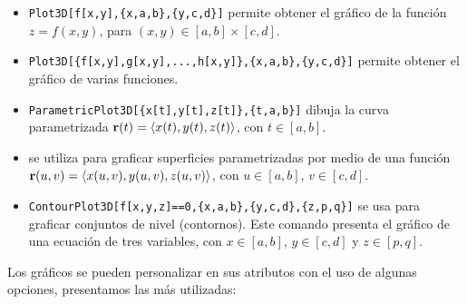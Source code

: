       \begin{itemize}
        \item \verb"Plot3D[f[x,y],{x,a,b},{y,c,d}]" permite obtener el gráfico de la función
          $z=f(x,y)$, para $(x,y) \in [a,b] \times [c,d]$.
        \item \texttt{Plot3D[\allowbreak\{f[x,y],\allowbreak g[x,y],\allowbreak ...,h[x,y]\},\allowbreak \{x,a,b\},\allowbreak \{y,c,d\}]}\newline
          permite obtener el gráfico de varias funciones.
        \item \Verb!ParametricPlot3D[{x[t],y[t],z[t]},{t,a,b}]!
          dibuja la curva parametrizada $\mathbf{r}(t)=\langle x(t),y(t),z(t) \rangle $,
          con $t\in[a,b]$.  
        \item {}
          se utiliza para graficar superficies parametrizadas por medio de una función
          $\mathbf{r}(u,v)=\langle x(u,v),y(u,v),z(u,v) \rangle $, con
          $u\in[a,b]$, $v\in[c,d]$.
        \item \verb"ContourPlot3D[f[x,y,z]==0,{x,a,b},{y,c,d},{z,p,q}]" se \linebreak
          usa para graficar conjuntos de nivel (contornos).
          Este comando presenta el gráfico de una ecuación de tres variables, con $x\in[a,b]$,
          $y\in[c,d]$ y $z\in[p,q]$.  
      \end{itemize}

      Los gráficos se pueden personalizar en sus atributos con el uso de algunas opciones,
      presentamos las más utilizadas:

